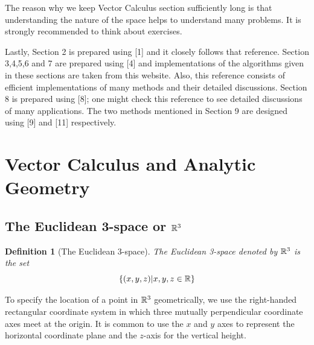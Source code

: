 \documentclass[12pt]{article}
\newtheorem{defn}{Definition}[section]
\begin{document}
The reason why we keep Vector Calculus section sufficiently long is that understanding the
nature of the space helps to understand many problems. It is strongly recommended to
think about exercises.

Lastly, Section 2 is prepared using [1] and it closely follows that reference. Section 3,4,5,6 and 7 are prepared using [4] and implementations of the algorithms given in these sections are taken from this website. Also, this reference consists of efficient implementations of many methods and their detailed discussions. Section 8 is prepared using [8]; one might check this reference to see detailed discussions of many applications. The two methods mentioned in Section 9 are designed using [9] and [11] respectively.

\section{Vector Calculus and Analytic Geometry}

\subsection{The Euclidean 3-space or $\mathbb{R}^3$}
\begin{defn}[The Euclidean 3-space]
  The Euclidean 3-space denoted by $\mathbb{R}^3$ is the set 
  $$ \{ (x,y,z) | x,y,z \in \mathbb{R} \} $$
\end{defn}

To specify the location of a point in $\mathbb{R}^3$ geometrically, we use the right-handed
rectangular coordinate system in which three mutually perpendicular coordinate axes meet at the origin.
It is common to use the $x$ and $y$ axes to represent the horizontal coordinate plane and the
$z$-axis for the vertical height.
\end{document}
